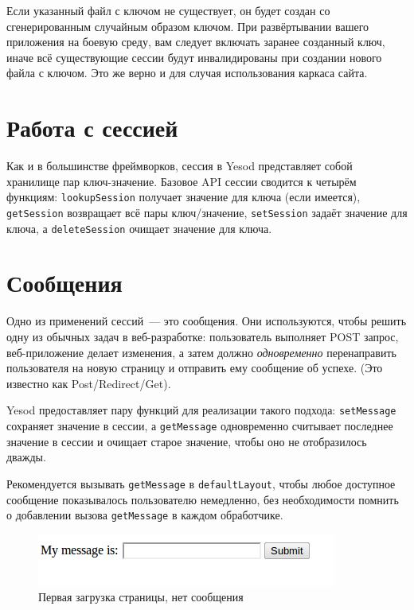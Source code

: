 \begin{remark}
    Если указанный файл с ключом не существует, он будет создан со
    сгенерированным случайным образом ключом. При развёртывании вашего
    приложения на боевую среду, вам следует включать заранее созданный ключ,
    иначе всё существующие сессии будут инвалидированы при создании нового
    файла с ключом. Это же верно и для случая использования каркаса сайта.
\end{remark}

\section{Работа с сессией}

Как и в большинстве фреймворков, сессия в Yesod представляет собой хранилище
пар ключ-значение. Базовое API сессии сводится к четырём функциям:
\lstinline'lookupSession' получает значение для ключа (если имеется),
\lstinline'getSession' возвращает всё пары ключ/значение,
\lstinline'setSession' задаёт значение для ключа, а \lstinline'deleteSession'
очищает значение для ключа.


\section{Сообщения}

Одно из применений сессий~--- это сообщения. Они используются, чтобы решить
одну из обычных задач в веб-разработке: пользователь выполняет POST запрос,
веб-приложение делает изменения, а затем должно \emph{одновременно}
перенаправить пользователя на новую страницу и отправить ему сообщение об
успехе. (Это известно как Post/Redirect/Get).

Yesod предоставляет пару функций для реализации такого подхода:
\lstinline'setMessage' сохраняет значение в сессии, а \lstinline'getMessage'
одновременно считывает последнее значение в сессии и очищает старое значение,
чтобы оно не отобразилось дважды.

Рекомендуется вызывать \lstinline'getMessage' в \lstinline'defaultLayout',
чтобы любое доступное сообщение показывалось пользователю немедленно, без
необходимости помнить о добавлении вызова \lstinline'getMessage' в каждом
обработчике.


\begin{figure}[tbh]
  \centering
  \includegraphics{sessions/image-01.png}
  \caption{Первая загрузка страницы, нет сообщения}
\end{figure}

